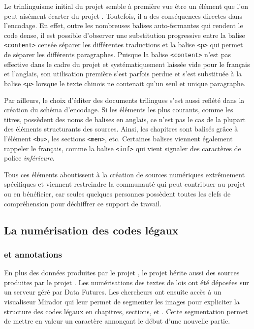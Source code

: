 Le trinlinguisme initial du projet \LSC semble à première vue être un élément que l'on peut aisément écarter du projet \COREL. Toutefois, il a des conséquences directes dans l'encodage. En effet, outre les nombreuses balises auto-fermantes qui rendent le code dense, il est possible d'observer une substitution progressive entre la balise \texttt{<content>} censée séparer les différentes traductions et la balise \texttt{<p>} qui permet de séparer les différents paragraphes. Puisque la balise \texttt{<content>} n'est pas effective dans le cadre du projet \COREL et systématiquement laissée vide pour le français et l'anglais, son utilisation première s'est parfois perdue et s'est substituée à la balise \texttt{<p>} lorsque le texte chinois ne contenait qu'un seul et unique paragraphe. 

Par ailleurs, le choix d'éditer des documents trilingues s'est aussi reflété dans la création du schéma d'encodage. Si les éléments les plus courants, comme les titres, possèdent des noms de balises en anglais, ce n'est pas le cas de la plupart des éléments structurants des sources. Ainsi, les chapitres sont balisés grâce à l'élément \texttt{<bu>}, les sections \texttt{<men>}, etc. Certaines balises viennent également rappeler le français, comme la balise \texttt{<inf>} qui vient signaler des caractères de police \textit{inférieure}. 

Tous ces éléments aboutissent à la création de sources numériques extrêmement spécifiques et viennent restreindre la communauté qui peut contribuer au projet ou en bénéficier, car seules quelques personnes possèdent toutes les clefs de compréhension pour déchiffrer ce support de travail. 

\subsection{La numérisation des codes légaux}
\subsubsection{\IIIF et annotations}
En plus des données produites par le projet \LSC, le projet \COREL hérite aussi des sources produites par le projet \EPJ. Les numérisations des textes de lois ont été déposées sur un serveur \IIIF géré par Data Futures. Les chercheurs ont ensuite accès à un visualiseur Mirador qui leur permet de segmenter les images pour expliciter la structure des codes légaux en chapitres, sections, \lu et \li. Cette segmentation permet de mettre en valeur un caractère annonçant le début d'une nouvelle partie. 

